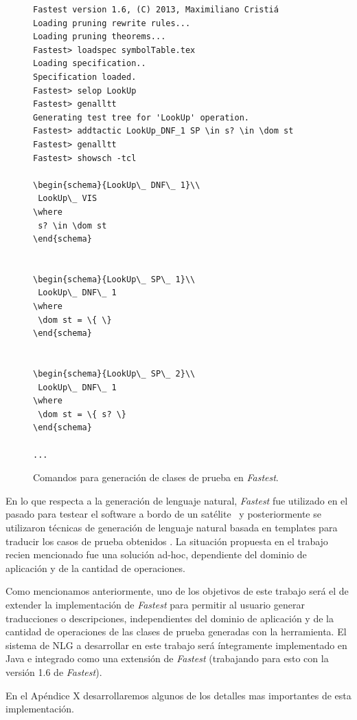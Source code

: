 \begin{figure}[H]
\begin{Verbatim}[frame=single]
Fastest version 1.6, (C) 2013, Maximiliano Cristiá
Loading pruning rewrite rules...
Loading pruning theorems...
Fastest> loadspec symbolTable.tex
Loading specification..
Specification loaded.
Fastest> selop LookUp
Fastest> genalltt 
Generating test tree for 'LookUp' operation.
Fastest> addtactic LookUp_DNF_1 SP \in s? \in \dom st
Fastest> genalltt                                    
Fastest> showsch -tcl

\begin{schema}{LookUp\_ DNF\_ 1}\\
 LookUp\_ VIS 
\where
 s? \in \dom st
\end{schema}


\begin{schema}{LookUp\_ SP\_ 1}\\
 LookUp\_ DNF\_ 1 
\where
 \dom st = \{ \}
\end{schema}


\begin{schema}{LookUp\_ SP\_ 2}\\
 LookUp\_ DNF\_ 1 
\where
 \dom st = \{ s? \}
\end{schema}

...
\end{Verbatim}
\caption{Comandos para generación de clases de prueba en \emph{Fastest}.}
\label{ej:comandos_fastest}
\end{figure}


En lo que respecta a la generación de lenguaje natural, \emph{Fastest} fue utilizado en el pasado para testear el software a bordo de un satélite~\cite{satelite} y posteriormente se utilizaron técnicas de generación de lenguaje natural basada en templates para traducir los casos de prueba obtenidos \cite{cristia_pluss}. La situación propuesta en el trabajo recien mencionado fue una solución ad-hoc, dependiente del dominio de aplicación y de la cantidad de operaciones.


Como mencionamos anteriormente, uno de los objetivos de este trabajo será el de extender la implementación de \emph{Fastest} para permitir al usuario generar traducciones o descripciones, independientes del dominio de aplicación y de la cantidad de operaciones de las clases de prueba generadas con la herramienta.
El sistema de NLG a desarrollar en este trabajo será íntegramente implementado en Java e integrado como una extensión de \emph{Fastest} (trabajando para esto con la versión 1.6 de \emph{Fastest}).


En el Apéndice X desarrollaremos algunos de los detalles mas importantes de esta implementación.